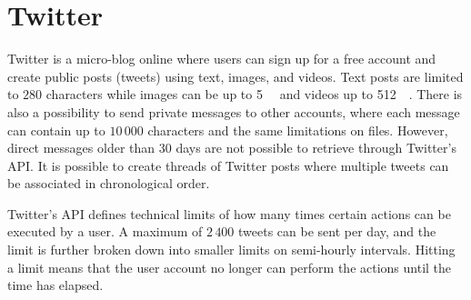 \section{Twitter}
Twitter is a micro-blog online where users can sign up for a free account and create public posts (tweets) using text, images, and videos. Text posts are limited to $280$ characters while images can be up to \SI{5}{\mega\byte} and videos up to \SI{512}{\mega\byte}\cite{MediaBestPractices}. There is also a possibility to send private messages to other accounts, where each message can contain up to $10\,000$ characters and the same limitations on files. However, direct messages older than $30$ days are not possible to retrieve through Twitter's API\cite{RetrievingOlder302018}. It is possible to create threads of Twitter posts where multiple tweets can be associated in chronological order.

Twitter's API defines technical limits of how many times certain actions can be executed by a user\cite{UnderstandingTwitterLimits}. A maximum of $2\,400$ tweets can be sent per day, and the limit is further broken down into smaller limits on semi-hourly intervals. Hitting a limit means that the user account no longer can perform the actions until the time has elapsed.